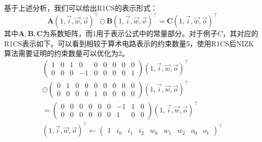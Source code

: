 基于上述分析，我们可以给出R1CS的表示形式：
\begin{equation}
\label{equ:r1cs}
\mathbf{A}(1, \vec{i}, \vec{w}, \vec{o})^\top \odot \mathbf{B}(1, \vec{i}, \vec{w}, \vec{o})^\top = \mathbf{C}(1, \vec{i}, \vec{w}, \vec{o})^\top
\end{equation}
其中$\mathbf{A}, \mathbf{B}, \mathbf{C}$为系数矩阵，而1用于表示公式中的常量部分。对于例子$C$，其对应的R1CS表示如下。可以看到相较于算术电路表示的约束数量5，使用R1CS后NIZK算法需要证明的约束数量可以优化为2。
\begin{equation}
    \begin{split}
        \left( \begin{array}{ccccccccc}
            1 & 0 & 1 & 0 & 0 & 0 & 0 & 0 & 0 \\
            0 & 0 & 0 & -1 & 0 & 0 & 0 & 0 & 1
            \end{array} \right) (1, \vec{i}, \vec{w}, \vec{o})^\top 
        \\ \odot
        \left( \begin{array}{ccccccccc}
            0 & 1 & 0 & 0 & 0 & 0 & 0 & 0 & 0 \\
            0 & 0 & 0 & 0 & 1 & 0 & 0 & 0 & 0
            \end{array} \right) (1, \vec{i}, \vec{w}, \vec{o})^\top 
        \\ = 
        \left( \begin{array}{ccccccccc}
            0 & 0 & 0 & 0 & 0 & 0 & -1 & 1 & 0 \\
            0 & 0 & 0 & 0 & 0 & 0 & 1 & 0 & 0
            \end{array} \right) (1, \vec{i}, \vec{w}, \vec{o})^\top
        \\ (1, \vec{i}, \vec{w}, \vec{o})^\top \leftarrow 
        \left( \begin{array}{ccccccccc}
            1 & i_0 & i_1 & i_2 & w_0 & w_1 & w_2 & o_0 & o_1
        \end{array} \right)^\top
\end{split}
\end{equation}

